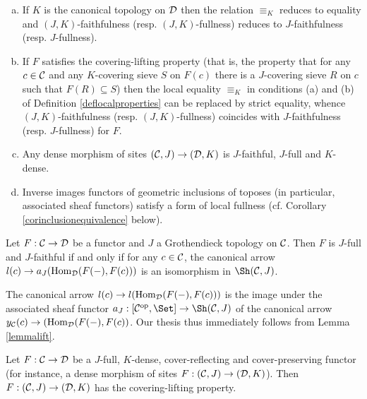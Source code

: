 \documentclass[a4paper,12pt]{article}
\begin{document}
\begin{remarks}\label{remcoveringliftingstrictequality}
	\begin{enumerate}[(a)]
		\item If $K$ is the canonical topology on $\cal D$ then the relation $\equiv_{K}$ reduces to equality and $(J, K)$-faithfulness (resp. $(J, K)$-fullness) reduces to $J$-faithfulness (resp. $J$-fullness). 
		
		\item If $F$ satisfies the covering-lifting property (that is, the property that for any $c\in {\cal C}$ and any $K$-covering sieve $S$ on $F(c)$ there is a $J$-covering sieve $R$ on $c$ such that $F(R)\subseteq S$) then the local equality $\equiv_{K}$ in conditions (a) and (b) of Definition \ref{deflocalproperties} can be replaced by strict equality, whence $(J, K)$-faithfulness (resp. $(J, K)$-fullness) coincides with $J$-faithfulness (resp. $J$-fullness) for $F$.  
		
		\item Any dense morphism of sites $({\cal C}, J)\to ({\cal D}, K)$ is $J$-faithful, $J$-full and $K$-dense.
		
		\item Inverse images functors of geometric inclusions of toposes (in particular, associated sheaf functors) satisfy a form of local fullness (cf. Corollary \ref{corinclusionequivalence} below).
	\end{enumerate}	
\end{remarks}
	

\begin{proposition}\label{proplocalfullnessandfaithfulness}
	Let $F:{\cal C}\to {\cal D}$ be a functor and $J$ a Grothendieck topology on $\cal C$. Then $F$ is $J$-full and $J$-faithful if and only if for any $c\in {\cal C}$, the canonical arrow $l(c)\to a_{J}(\textup{Hom}_{\cal D}(F(-), F(c)))$ is an isomorphism in $\Sh({\cal C}, J)$.
\end{proposition}

\begin{proofs}
	The canonical arrow $l(c)\to l(\textup{Hom}_{\cal D}(F(-), F(c)))$ is the image under the associated sheaf functor $a_{J}:[{\cal C}^{\textup{op}}, \Set]\to \Sh({\cal C}, J)$ of the canonical arrow $y_{\cal C}(c)\to (\textup{Hom}_{\cal D}(F(-), F(c))$. Our thesis thus immediately follows from Lemma \ref{lemmalift}. 	
\end{proofs}

\begin{proposition}\label{propcovlifting}
	Let $F:{\cal C}\to {\cal D}$ be a $J$-full, $K$-dense, cover-reflecting and cover-preserving functor (for instance, a dense morphism of sites $F:({\cal C}, J)\to ({\cal D}, K)$). Then $F:({\cal C}, J)\to ({\cal D}, K)$ has the covering-lifting property. 
\end{proposition}
\end{document}
